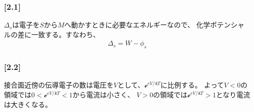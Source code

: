 \documentclass[\main/main.tex]{subfiles}
\begin{document}
\subsubsection*{
  [2.1]
}
$Δ_𝑠$は電子を$S$から$M$へ動かすときに必要なエネルギーなので、
化学ポテンシャルの差に一致する。すなわち、
\begin{align}
  Δ_𝑠 = W - ϕ_𝑠
\end{align}
\subsubsection*{
  [2.2]
}
接合面近傍の伝導電子の数は電圧を$V$として、$ℯ^{eV/𝘬T}$に比例する。
よって$V<0$の領域では$0<ℯ^{eV/𝘬T}<1$から電流は小さく、
$V>0$の領域では$ℯ^{eV/𝘬T}>1$となり電流は大きくなる。
\end{document}
